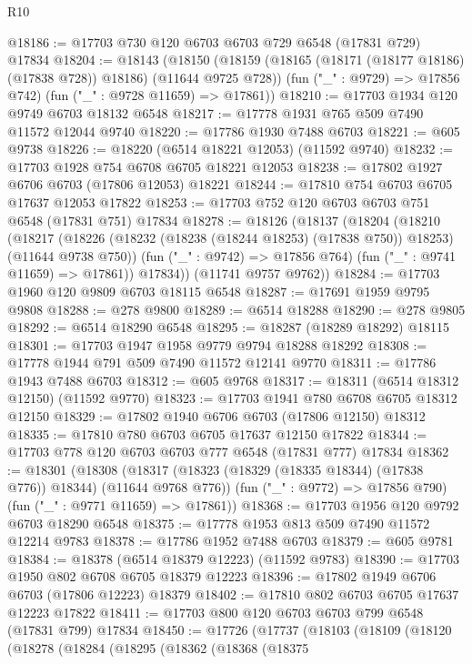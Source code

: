\begin{lexlean}{R10}
\begin{coremodule}
@18186 := @17703 @730 @120 @6703 @6703 @729 @6548 (@17831 @729) @17834
@18204 := @18143
    (@18150
      (@18159 (@18165 (@18171 (@18177 @18186) (@17838 @728)) @18186) (@11644 @9725 @728))
      (fun ("_" : @9729) => @17856 @742)
      (fun ("_" : @9728 @11659) => @17861))
@18210 := @17703 @1934 @120 @9749 @6703 @18132 @6548
@18217 := @17778 @1931 @765 @509 @7490 @11572 @12044 @9740
@18220 := @17786 @1930 @7488 @6703
@18221 := @605 @9738
@18226 := @18220 (@6514 @18221 @12053) (@11592 @9740)
@18232 := @17703 @1928 @754 @6708 @6705 @18221 @12053
@18238 := @17802 @1927 @6706 @6703 (@17806 @12053) @18221
@18244 := @17810 @754 @6703 @6705 @17637 @12053 @17822
@18253 := @17703 @752 @120 @6703 @6703 @751 @6548 (@17831 @751) @17834
@18278 := @18126
    (@18137
      (@18204
        (@18210
          (@18217
            (@18226 (@18232 (@18238 (@18244 @18253) (@17838 @750)) @18253) (@11644 @9738 @750))
            (fun ("_" : @9742) => @17856 @764)
            (fun ("_" : @9741 @11659) => @17861))
          @17834))
      (@11741 @9757 @9762))
@18284 := @17703 @1960 @120 @9809 @6703 @18115 @6548
@18287 := @17691 @1959 @9795 @9808
@18288 := @278 @9800
@18289 := @6514 @18288
@18290 := @278 @9805
@18292 := @6514 @18290 @6548
@18295 := @18287 (@18289 @18292) @18115
@18301 := @17703 @1947 @1958 @9779 @9794 @18288 @18292
@18308 := @17778 @1944 @791 @509 @7490 @11572 @12141 @9770
@18311 := @17786 @1943 @7488 @6703
@18312 := @605 @9768
@18317 := @18311 (@6514 @18312 @12150) (@11592 @9770)
@18323 := @17703 @1941 @780 @6708 @6705 @18312 @12150
@18329 := @17802 @1940 @6706 @6703 (@17806 @12150) @18312
@18335 := @17810 @780 @6703 @6705 @17637 @12150 @17822
@18344 := @17703 @778 @120 @6703 @6703 @777 @6548 (@17831 @777) @17834
@18362 := @18301
    (@18308
      (@18317 (@18323 (@18329 (@18335 @18344) (@17838 @776)) @18344) (@11644 @9768 @776))
      (fun ("_" : @9772) => @17856 @790)
      (fun ("_" : @9771 @11659) => @17861))
@18368 := @17703 @1956 @120 @9792 @6703 @18290 @6548
@18375 := @17778 @1953 @813 @509 @7490 @11572 @12214 @9783
@18378 := @17786 @1952 @7488 @6703
@18379 := @605 @9781
@18384 := @18378 (@6514 @18379 @12223) (@11592 @9783)
@18390 := @17703 @1950 @802 @6708 @6705 @18379 @12223
@18396 := @17802 @1949 @6706 @6703 (@17806 @12223) @18379
@18402 := @17810 @802 @6703 @6705 @17637 @12223 @17822
@18411 := @17703 @800 @120 @6703 @6703 @799 @6548 (@17831 @799) @17834
@18450 := @17726
    (@17737
      (@18103
        (@18109
          (@18120
            (@18278
              (@18284
                (@18295
                  (@18362
                    (@18368
                      (@18375

\end{coremodule}
\end{lexlean}
